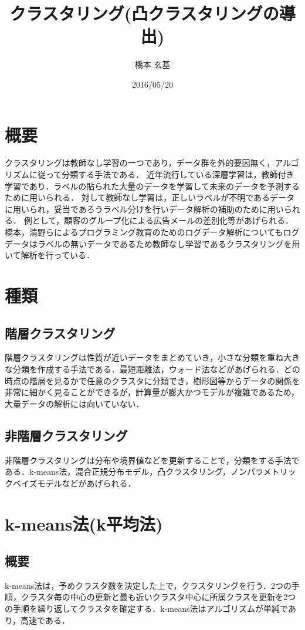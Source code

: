 \documentclass[a4j]{jsarticle}
\title{クラスタリング(凸クラスタリングの導出)}
\author{橋本 玄基}
\date{2016/05/20}
\begin{document}
\maketitle


\section{概要}
クラスタリングは教師なし学習の一つであり，データ群を外的要因無く，アルゴリズムに従って分類する手法である．
近年流行している深層学習は，教師付き学習であり．ラベルの貼られた大量のデータを学習して未来のデータを予測するために用いられる．
対して教師なし学習は，正しいラベルが不明であるデータに用いられ，妥当であろうラベル分けを行いデータ解析の補助のために用いられる．
例として，顧客のグループ化による広告メールの差別化等があげられる．橋本，清野らによるプログラミング教育のためのログデータ解析についてもログデータはラベルの無いデータであるため教師なし学習であるクラスタリングを用いて解析を行っている．


\section{種類}
\subsection{階層クラスタリング}
階層クラスタリングは性質が近いデータをまとめていき，小さな分類を重ね大きな分類を作成する手法である．最短距離法，ウォード法などがあげられる．どの時点の階層を見るかで任意のクラスタに分類でき，樹形図等からデータの関係を非常に細かく見ることができるが，計算量が膨大かつモデルが複雑であるため，大量データの解析には向いていない．
\subsection{非階層クラスタリング}
非階層クラスタリングは分布や境界値などを更新することで，分類をする手法である．k-means法，混合正規分布モデル，凸クラスタリング，ノンパラメトリックベイズモデルなどがあげられる．

\section{k-means法(k平均法)}
\subsection{概要}
k-means法は，予めクラスタ数を決定した上で，クラスタリングを行う．2つの手順，クラスタ毎の中心の更新と最も近いクラスタ中心に所属クラスを更新を2つの手順を繰り返してクラスタを確定する．k-means法はアルゴリズムが単純であり，高速である．
\end{document}
